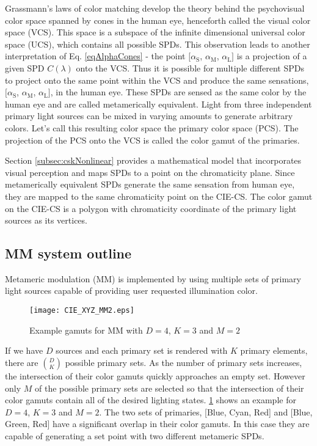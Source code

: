 Grassmann's laws \cite{gra54a} of color matching develop the theory behind the psychovisual color space spanned by cones in the human eye, henceforth called the visual color space (VCS).  This space is a subspace  of the infinite dimensional universal color space (UCS), which contains all possible SPDs. This observation leads to another interpretation of Eq. \eqref{eqAlphaCones} - the point $[{\alpha}_{\text{S}}$, ${\alpha}_{\text{M}}$, ${\alpha}_{\text{L}}]$ is a projection of a given SPD $C(\lambda)$ onto the VCS. Thus it is possible for multiple different SPDs to project onto the same point within the VCS and produce the same sensations, $[{\alpha}_{\text{S}}$, ${\alpha}_{\text{M}}$, ${\alpha}_{\text{L}}]$, in the human eye. These SPDs are sensed as the same color by the human eye and are called metamerically equivalent. Light from three independent primary light sources can be mixed in varying amounts to generate arbitrary colors. Let's call this resulting color space the primary color space (PCS). The projection of the PCS onto the VCS is called the color gamut of the primaries.

Section \ref{subsec:cskNonlinear} provides a mathematical model that incorporates visual perception and maps SPDs to a point on the chromaticity plane. Since metamerically equivalent SPDs generate the same sensation from human eye, they are mapped to the same chromaticity point on the CIE-CS. The color gamut on the CIE-CS is a polygon with chromaticity coordinate of the primary light sources as its vertices.

\subsection{MM system outline}
\label{subsec:metamericMM}
Metameric modulation (MM) is implemented by using multiple sets of primary light sources capable of providing user requested illumination color.
\begin{figure}[!t]
	\centering
    \texttt{[image: CIE\_XYZ\_MM2.eps]}
	\caption{Example gamuts for MM with $D=4$, $K=3$ and $M=2$}
	\label{figCIEXYZMM}
\end{figure}
If we have $D$ sources and each primary set is rendered with $K$ primary elements, there are $\binom{D}{K}$ possible primary sets. As the number of primary sets increases, the intersection of their color gamuts quickly approaches an empty set. However only $M$ of the possible primary sets are selected so that the intersection of their color gamuts contain all of the desired lighting states. \figurename{ \ref{figCIEXYZMM}} shows an example for $D=4$, $K=3$ and $M=2$. The two sets of primaries, [Blue, Cyan, Red] and [Blue, Green, Red] have a significant overlap in their color gamuts. In this case they are capable of generating a set point with two different metameric SPDs. 

